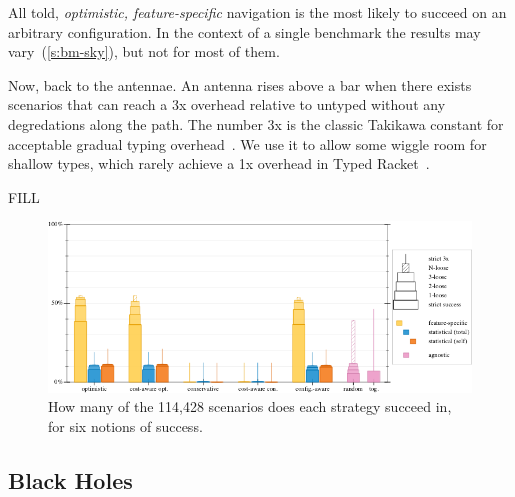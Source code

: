 All told, \emph{optimistic, feature-specific} navigation is the most likely to
succeed on an arbitrary configuration.
In the context of a single benchmark the results may vary~(\cref{s:bm-sky}),
but not for most of them.

Now, back to the antennae.
An antenna rises above a bar when there exists scenarios that can reach a 3x overhead
relative to untyped without any degredations along the path.
The number 3x is the classic Takikawa constant for acceptable gradual typing
overhead~\cite{tfgnvf-popl-2016,vss-popl-2017,bbst-oopsla-2017}.
We use it to allow some wiggle room for shallow types, which rarely achieve a
1x overhead in Typed Racket~\cite{g-deep-shallow}.

FILL


\begin{figure}[t]
  \includegraphics[width=\columnwidth]{data/strategy-overall-feasible.pdf}
  \caption{How many of the 114,428 scenarios does each strategy succeed in, for six notions of success.}
  \label{f:strategy-overall}
\end{figure}


\subsection{Black Holes}

